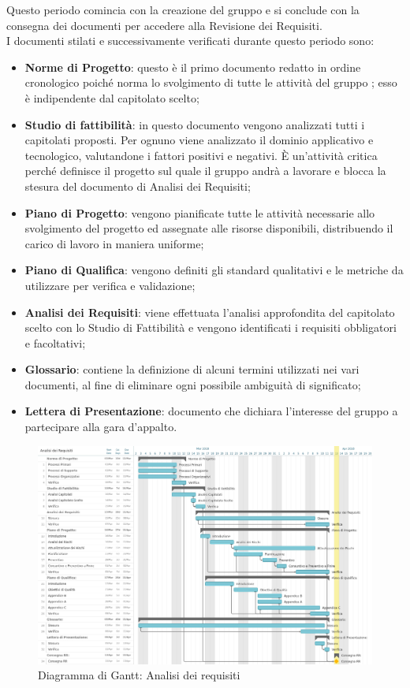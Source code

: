 Questo periodo comincia con la creazione del gruppo e si conclude con la consegna dei documenti per accedere alla Revisione dei Requisiti.\\
I documenti stilati e successivamente verificati durante questo periodo sono:
\begin{itemize}
\item \textbf{Norme di Progetto}: questo è il primo documento redatto in ordine cronologico poiché norma lo svolgimento di tutte le attività del gruppo \Gruppo; esso è indipendente dal capitolato scelto;
\item \textbf{Studio di fattibilità}: in questo documento vengono analizzati tutti i capitolati proposti. Per ognuno viene analizzato il dominio applicativo e tecnologico, valutandone i fattori positivi e negativi. È un’attività critica perché definisce il progetto sul quale il gruppo andrà a lavorare e blocca la stesura del documento di Analisi dei Requisiti;
\item \textbf{Piano di Progetto}: vengono pianificate tutte le attività necessarie allo svolgimento del progetto ed assegnate alle risorse disponibili, distribuendo il carico di lavoro in maniera uniforme;
\item \textbf{Piano di Qualifica}: vengono definiti gli standard qualitativi e le metriche da utilizzare per verifica e validazione;
\item \textbf{Analisi dei Requisiti}: viene effettuata l’analisi approfondita del capitolato scelto con lo Studio di Fattibilità e vengono identificati i requisiti obbligatori e facoltativi;
\item \textbf{Glossario}: contiene la definizione di alcuni termini utilizzati nei vari documenti, al fine di eliminare ogni possibile ambiguità di significato;
\item \textbf{Lettera di Presentazione}: documento che dichiara l’interesse del gruppo a partecipare alla gara d’appalto.
\end{itemize}

\begin{figure}[h!]
	\centerline{\includegraphics[scale=0.4]{img/DiagrammiGantt/AnalisiRequisiti.jpg}}
	\caption{Diagramma di Gantt: Analisi dei requisiti}
	\label{fig:gantt_ana_req}
\end{figure}
\clearpage

